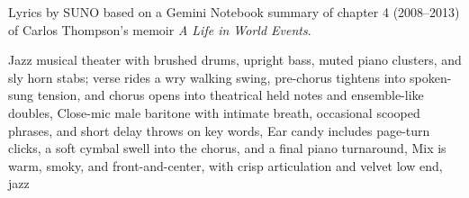 
\begin{notes}
Lyrics by SUNO based on a Gemini Notebook summary of chapter 4 (2008--2013) of Carlos Thompson's memoir \emph{A Life in World Events}.
\end{notes}
\begin{style}
Jazz musical theater with brushed drums, upright bass, muted piano clusters, and sly horn stabs; verse rides a wry walking swing, pre-chorus tightens into spoken-sung tension, and chorus opens into theatrical held notes and ensemble-like doubles, Close-mic male baritone with intimate breath, occasional scooped phrases, and short delay throws on key words, Ear candy includes page-turn clicks, a soft cymbal swell into the chorus, and a final piano turnaround, Mix is warm, smoky, and front-and-center, with crisp articulation and velvet low end, jazz
\end{style}
